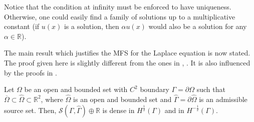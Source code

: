 \begin{remark}
    Notice that the condition at infinity must be enforced to have uniqueness. Otherwise, one could easily find a family of solutions up to a multiplicative constant (if \(u(x)\) is a solution, then \(\alpha u(x)\) would also be a solution for any \(\alpha \in \mathbb{R}\)).
\end{remark}
The main result which justifies the MFS for the Laplace equation is now stated. The proof given here is slightly different from the ones in \cite{bogomolny1985fundamental}, \cite{alves2009choice}. It is also influenced by the proofs in \cite{svilen_phd}.
\begin{theorem}\label{mfs_lap_dense}
    Let \(\Omega\) be an open and bounded set with \(C^2\) boundary \(\Gamma = \partial \Omega\) such that \(\overline{\Omega} \subset \hat{\Omega} \subset \mathbb{R}^2\), where \(\hat{\Omega}\) is an open and bounded set and \(\hat{\Gamma} = \partial \hat{\Omega}\) is an admissible source set. Then, \(\mathcal{S}(\Gamma, \hat{\Gamma}) \oplus \mathbb{R}\) is dense in \(H^\frac{1}{2}(\Gamma)\) and in \(H^{-\frac{1}{2}}(\Gamma)\).
\end{theorem}
